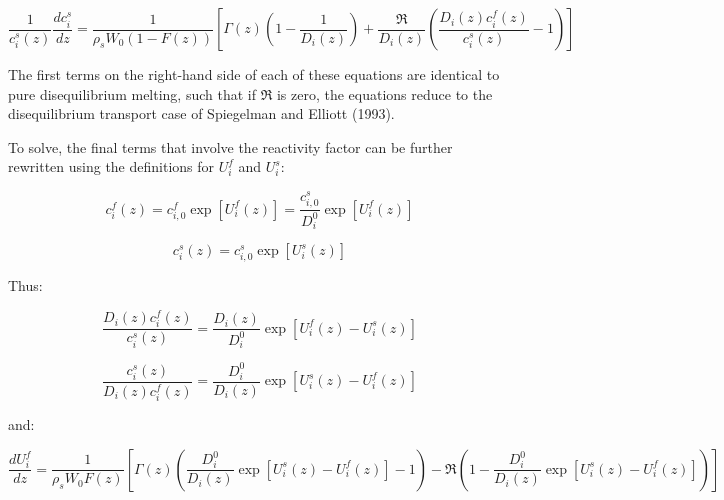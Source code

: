 \documentclass[draft]{agujournal2019}
\begin{document}
\begin{linenomath*}
\begin{equation}
    \frac{1}{c_i^s(z)}\frac{dc_i^s}{dz} = \frac{1}{\rho_s W_0 (1 - F(z))}\left[\Gamma(z) \left(1 - \frac{1}{D_i(z)}\right)+ \frac{\Re}{D_i(z)}\left(\frac{D_i(z) c_i^f(z)}{c_i^s(z)} - 1\right) \right]\label{eq:41}
\end{equation}
\end{linenomath*}

The first terms on the right-hand side of each of these equations are identical to pure disequilibrium melting, such that if $\Re$ is zero, the equations reduce to the disequilibrium transport case of Spiegelman and Elliott (1993).

To solve, the final terms that involve the reactivity factor can be further rewritten using the definitions for $U_i^f$ and $U_i^s$:

\begin{linenomath*}
\begin{equation}
    c_i^f(z) = c_{i,0}^f \exp[U_i^f(z)] = \frac{c_{i,0}^s}{D_i^0} \exp[U_i^f(z)]\label{eq:42}
\end{equation}
\end{linenomath*}

\begin{linenomath*}
\begin{equation}
    c_i^s(z) = c_{i,0}^s \exp[U_i^s(z)]\label{eq:43}
\end{equation}
\end{linenomath*}

Thus:

\begin{linenomath*}
\begin{equation}
    \frac{D_i(z) c_i^f(z)}{c_i^s(z)} = \frac{D_i(z)}{D_i^0} \exp[U_i^f(z) - U_i^s(z)]\label{eq:44}
\end{equation}
\end{linenomath*}

\begin{linenomath*}
\begin{equation}
    \frac{c_i^s(z)}{D_i(z) c_i^f(z)} = \frac{D_i^0}{D_i(z)} \exp[U_i^s(z) - U_i^f(z)]\label{eq:45}
\end{equation}
\end{linenomath*}

and:

\begin{linenomath*}
\begin{equation}
    \frac{dU_i^f}{dz} = \frac{1}{\rho_s W_0 F(z)}\left[\Gamma(z)\left(\frac{D_i^0}{D_i(z)} \exp[U_i^s(z) - U_i^f(z)] - 1\right) - \Re\left(1 - \frac{D_i^0}{D_i(z)} \exp[U_i^s(z) - U_i^f(z)]\right)\right]\label{eq:46}
\end{equation}
\end{linenomath*}
\end{document}
